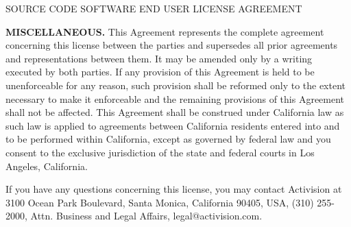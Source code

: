 \begin{section}{SOURCE CODE SOFTWARE END USER LICENSE AGREEMENT}
\begin{flushleft}
\textbf{{\footnotesize MISCELLANEOUS. }}{\footnotesize This Agreement represents the complete agreement concerning this license between the parties and supersedes all prior agreements and representations between them.  It may be amended only by a writing executed by both parties.  If any provision of this Agreement is held to be unenforceable for any reason, such provision shall be reformed only to the extent necessary to make it enforceable and the remaining provisions of this Agreement shall not be affected.  This Agreement shall be construed under California law as such law is applied to agreements between California residents entered into and to be performed within California, except as governed by federal law and you consent to the exclusive jurisdiction of the state and federal courts in Los Angeles, California. }
\end{flushleft}


\begin{flushleft}
{\footnotesize If you have any questions concerning this license, you may contact Activision at 3100 Ocean Park Boulevard, Santa Monica, California 90405, USA, (310) 255-2000, Attn. Business and Legal Affairs, legal@activision.com.}
\end{flushleft}


\end{section}%
